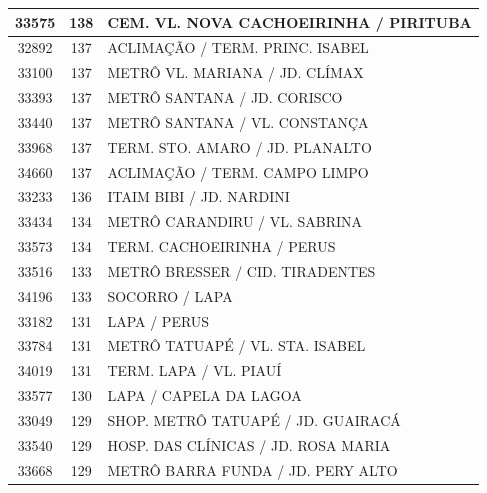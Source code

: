 \documentclass[
	12pt,				%
	oneside,			%
	a4paper,			%
	english,			%
	brazil				%
	]{abntex2ppgsi}
\begin{document}
\begin{apendicesenv}
\begin{longtable}{c|c|p{7cm}}
    33575 & 138   & CEM. VL. NOVA CACHOEIRINHA / PIRITUBA \\
\hline

    32892 & 137   & ACLIMAÇÃO / TERM. PRINC. ISABEL \\
\hline

    33100 & 137   & METRÔ VL. MARIANA / JD. CLÍMAX \\
\hline

    33393 & 137   & METRÔ SANTANA / JD. CORISCO \\
\hline

    33440 & 137   & METRÔ SANTANA / VL. CONSTANÇA \\
\hline

    33968 & 137   & TERM. STO. AMARO / JD. PLANALTO \\
\hline

    34660 & 137   & ACLIMAÇÃO / TERM. CAMPO LIMPO \\
\hline

    33233 & 136   & ITAIM BIBI / JD. NARDINI \\
\hline

    33434 & 134   & METRÔ CARANDIRU / VL. SABRINA \\
\hline

    33573 & 134   & TERM. CACHOEIRINHA / PERUS \\
\hline

    33516 & 133   & METRÔ BRESSER / CID. TIRADENTES \\
\hline

    34196 & 133   & SOCORRO / LAPA \\
\hline

    33182 & 131   & LAPA / PERUS \\
\hline

    33784 & 131   & METRÔ TATUAPÉ / VL. STA. ISABEL \\
\hline

    34019 & 131   & TERM. LAPA / VL. PIAUÍ \\
\hline

    33577 & 130   & LAPA / CAPELA DA LAGOA  \\
\hline

    33049 & 129   & SHOP. METRÔ TATUAPÉ / JD. GUAIRACÁ \\
\hline

    33540 & 129   & HOSP. DAS CLÍNICAS / JD. ROSA MARIA \\
\hline

    33668 & 129   & METRÔ BARRA FUNDA / JD. PERY ALTO \\
\hline


\end{longtable}
\end{apendicesenv}
\end{document}
